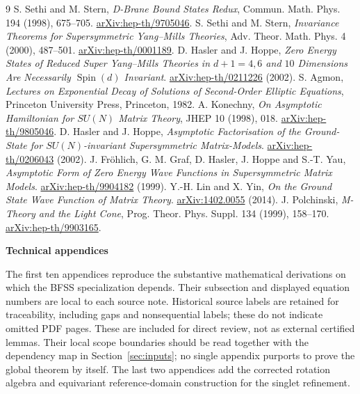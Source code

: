 \documentclass[11pt,letterpaper]{article}
\theoremstyle{definition}\newtheorem{hypothesis}[theorem]{Hypothesis}
\numberwithin{equation}{section}
\begin{document}
\begingroup
\small
\begin{thebibliography}{9}
 S. Sethi and M. Stern, \emph{D-Brane Bound States Redux}, Commun. Math. Phys. 194 (1998), 675--705. \href{https://arxiv.org/abs/hep-th/9705046}{arXiv:hep-th/9705046}.
 S. Sethi and M. Stern, \emph{Invariance Theorems for Supersymmetric Yang--Mills Theories}, Adv. Theor. Math. Phys. 4 (2000), 487--501. \href{https://arxiv.org/abs/hep-th/0001189}{arXiv:hep-th/0001189}.
 D. Hasler and J. Hoppe, \emph{Zero Energy States of Reduced Super Yang--Mills Theories in $d+1=4,6$ and $10$ Dimensions Are Necessarily $\operatorname{Spin}(d)$ Invariant}. \href{https://arxiv.org/abs/hep-th/0211226}{arXiv:hep-th/0211226} (2002).
 S. Agmon, \emph{Lectures on Exponential Decay of Solutions of Second-Order Elliptic Equations}, Princeton University Press, Princeton, 1982.
 A. Konechny, \emph{On Asymptotic Hamiltonian for $SU(N)$ Matrix Theory}, JHEP 10 (1998), 018. \href{https://arxiv.org/abs/hep-th/9805046}{arXiv:hep-th/9805046}.
 D. Hasler and J. Hoppe, \emph{Asymptotic Factorisation of the Ground-State for $SU(N)$-invariant Supersymmetric Matrix-Models}. \href{https://arxiv.org/abs/hep-th/0206043}{arXiv:hep-th/0206043} (2002).
 J. Fr\"ohlich, G. M. Graf, D. Hasler, J. Hoppe and S.-T. Yau, \emph{Asymptotic Form of Zero Energy Wave Functions in Supersymmetric Matrix Models}. \href{https://arxiv.org/abs/hep-th/9904182}{arXiv:hep-th/9904182} (1999).
 Y.-H. Lin and X. Yin, \emph{On the Ground State Wave Function of Matrix Theory}. \href{https://arxiv.org/abs/1402.0055}{arXiv:1402.0055} (2014).
 J. Polchinski, \emph{M-Theory and the Light Cone}, Prog. Theor. Phys. Suppl. 134 (1999), 158--170. \href{https://arxiv.org/abs/hep-th/9903165}{arXiv:hep-th/9903165}.
\end{thebibliography}
\endgroup

\clearpage
\appendix
\renewcommand{\theequation}{\thesection.\arabic{equation}}
\begin{center}\Large\bfseries Technical appendices\end{center}
The first ten appendices reproduce the substantive mathematical derivations on which the BFSS specialization depends. Their subsection and displayed equation numbers are local to each source note. Historical source labels are retained for traceability, including gaps and nonsequential labels; these do not indicate omitted PDF pages. These are included for direct review, not as external certified lemmas. Their local scope boundaries should be read together with the dependency map in Section~\ref{sec:inputs}; no single appendix purports to prove the global theorem by itself. The last two appendices add the corrected rotation algebra and equivariant reference-domain construction for the singlet refinement.
\end{document}
